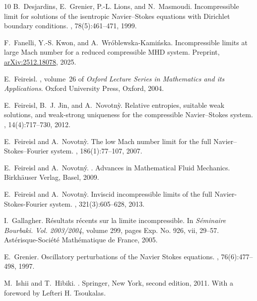 \documentclass[11pt, twoside, a4paper]{article}
\theoremstyle{plain}
\theoremstyle{remark}
\numberwithin{equation}{section}
\begin{document}
\begin{thebibliography}{10}
B.~Desjardins, E.~Grenier, P.-L. Lions, and N.~Masmoudi.
\newblock Incompressible limit for solutions of the isentropic
  {N}avier--{S}tokes equations with {D}irichlet boundary conditions.
, 78(5):461--471, 1999.

F.~Fanelli, Y.-S. Kwon, and A.~Wr{\'o}blewska-Kami{\'n}ska.
\newblock Incompressible limits at large {M}ach number for a reduced
  compressible {MHD} system.
\newblock Preprint, \href{https://arxiv.org/abs/2512.18078}{arXiv:2512.18078},
  2025.

E.~Feireisl.
, volume~26 of {\em
  Oxford Lecture Series in Mathematics and its Applications}.
\newblock Oxford University Press, Oxford, 2004.

E.~Feireisl, B.~J. Jin, and A.~Novotn{\`y}.
\newblock Relative entropies, suitable weak solutions, and weak-strong
  uniqueness for the compressible {N}avier--{S}tokes system.
, 14(4):717--730, 2012.

E.~Feireisl and A.~Novotn{\`y}.
\newblock The low {M}ach number limit for the full
  {N}avier--{S}tokes--{F}ourier system.
, 186(1):77--107, 2007.

E.~Feireisl and A.~Novotn\'y.
.
\newblock Advances in Mathematical Fluid Mechanics. Birkh\"auser Verlag, Basel,
  2009.

E.~Feireisl and A.~Novotn{\`y}.
\newblock Inviscid incompressible limits of the full
  {N}avier-{S}tokes-{F}ourier system.
, 321(3):605--628, 2013.

I.~Gallagher.
\newblock R\'esultats r\'ecents sur la limite incompressible.
\newblock In {\em S\'eminaire Bourbaki. Vol. 2003/2004}, volume 299, pages Exp.
  No. 926, vii, 29--57. Ast\'erisque-Soci{\'e}t{\'e} Math{\'e}matique de
  France, 2005.

E.~Grenier.
\newblock Oscillatory perturbations of the {N}avier {S}tokes equations.
, 76(6):477--498, 1997.

M.~Ishii and T.~Hibiki.
.
\newblock Springer, New York, second edition, 2011.
\newblock With a foreword by Lefteri H. Tsoukalas.


\end{thebibliography}
\end{document}
